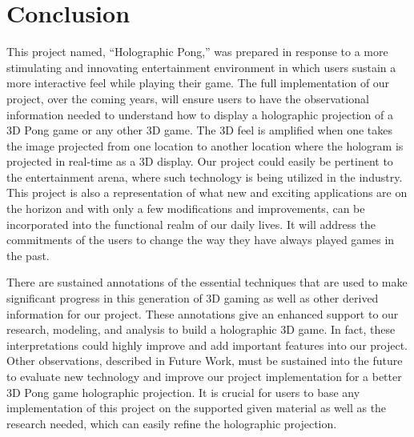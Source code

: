 \documentclass{sig-alternate}
\begin{document}
\section{Conclusion}
\label{conclusion}\normalfont 
		This project named, “Holographic Pong,” was prepared in response to a more stimulating and innovating entertainment environment in which users sustain a more interactive feel while playing their game. The full implementation of our project, over the coming years, will ensure users to have the observational information needed to understand how to display a holographic projection of a 3D Pong game or any other 3D game. The 3D feel is amplified when one takes the image projected from one location to another location where the hologram is projected in real-time as a 3D display. Our project could easily be pertinent to the entertainment arena, where such technology is being utilized in the industry. This project is also a representation of what new and exciting applications are on the horizon and with only a few modifications and improvements, can be incorporated into the functional realm of our daily lives. It will address the commitments of the users to change the way they have always played games in the past.  \newline
		
		There are sustained annotations of the essential techniques that are used to make significant progress in this generation of 3D gaming as well as other derived information for our project. These annotations give an enhanced support to our research, modeling, and analysis to build a holographic 3D game. In fact, these interpretations could highly improve and add important features into our project. Other observations, described in Future Work, must be sustained into the future to evaluate new technology and improve our project implementation for a better 3D Pong game holographic projection. It is crucial for users to base any implementation of this project on the supported given material as well as the research needed, which can easily refine the holographic projection. \newline 
	


\end{document}
